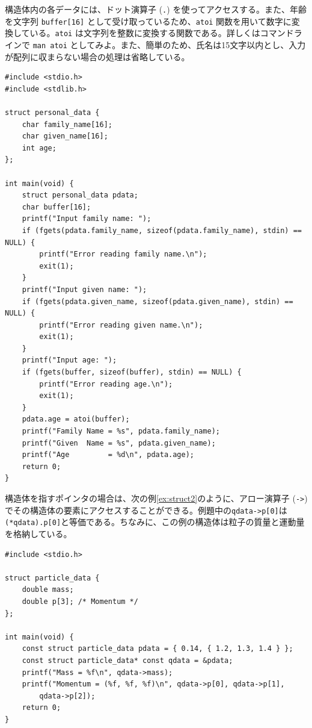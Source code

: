構造体内の各データには、ドット演算子 (\texttt{.}) を使ってアクセスする。また、年齢を文字列 \texttt{buffer[16]} として受け取っているため、\texttt{atoi} 関数を用いて数字に変換している。\texttt{atoi} は文字列を整数に変換する関数である。詳しくはコマンドラインで \texttt{man atoi} としてみよ。また、簡単のため、氏名は15文字以内とし、入力が配列に収まらない場合の処理は省略している。
\begin{reidai}\label{ex:struct1}
    \begin{verbatim}
#include <stdio.h>
#include <stdlib.h>

struct personal_data {
    char family_name[16];
    char given_name[16];
    int age;
};

int main(void) {
    struct personal_data pdata;
    char buffer[16];
    printf("Input family name: ");
    if (fgets(pdata.family_name, sizeof(pdata.family_name), stdin) ==  NULL) {
        printf("Error reading family name.\n");
        exit(1);
    }
    printf("Input given name: ");
    if (fgets(pdata.given_name, sizeof(pdata.given_name), stdin) == NULL) {
        printf("Error reading given name.\n");
        exit(1);
    }
    printf("Input age: ");
    if (fgets(buffer, sizeof(buffer), stdin) == NULL) {
        printf("Error reading age.\n");
        exit(1);
    }
    pdata.age = atoi(buffer);
    printf("Family Name = %s", pdata.family_name);
    printf("Given  Name = %s", pdata.given_name);
    printf("Age         = %d\n", pdata.age);
    return 0;
}
\end{verbatim}
\end{reidai} \noindent
構造体を指すポインタの場合は、次の例\ref{ex:struct2}のように、アロー演算子 (\texttt{->}) でその構造体の要素にアクセスすることができる。例題中の\texttt{qdata->p[0]}は\texttt{(*qdata).p[0]}と等価である。ちなみに、この例の構造体は粒子の質量と運動量を格納している。
\begin{reidai}\label{ex:struct2}
    \begin{verbatim}
#include <stdio.h>

struct particle_data {
    double mass;
    double p[3]; /* Momentum */
};

int main(void) {
    const struct particle_data pdata = { 0.14, { 1.2, 1.3, 1.4 } };
    const struct particle_data* const qdata = &pdata;
    printf("Mass = %f\n", qdata->mass);
    printf("Momentum = (%f, %f, %f)\n", qdata->p[0], qdata->p[1],
        qdata->p[2]);
    return 0;
}
\end{verbatim}
\end{reidai}

